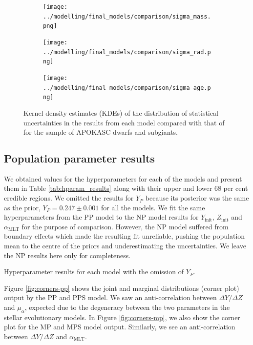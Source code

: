 \documentclass[a4paper,fleqn,usenatbib]{mnras}
\newcommand{\mlt}{\ensuremath{{\alpha_\mathrm{MLT}}}}
\begin{document}
\begin{figure}
    \centering
    \begin{subfigure}[b]{.33\linewidth}
        \centering
        \texttt{[image: ../modelling/final\_models/comparison/sigma\_mass.png]}
    \end{subfigure}%
    \begin{subfigure}[b]{.33\linewidth}
        \centering
        \texttt{[image: ../modelling/final\_models/comparison/sigma\_rad.png]}
    \end{subfigure}%
    \begin{subfigure}[b]{.33\linewidth}
        \centering
        \texttt{[image: ../modelling/final\_models/comparison/sigma\_age.png]}
    \end{subfigure}%
    \caption{Kernel density estimates (KDEs) of the distribution of statistical uncertainties in the results from each model compared with that of  for the sample of APOKASC dwarfs and subgiants.}
    \label{fig:unc-comp}
\end{figure}

\subsection{Population parameter results}\label{sec:hparam-results}

We obtained values for the hyperparameters for each of the models and present them in Table \ref{tab:hparam_results} along with their upper and lower 68 per cent credible regions. We omitted the results for $Y_P$ because its posterior was the same as the prior, $Y_P=0.247\pm0.001$ for all the models. We fit the same hyperparameters from the PP model to the NP model results for $Y_\mathrm{init}$, $Z_\mathrm{init}$ and $\mlt$ for the purpose of comparison. However, the NP model suffered from boundary effects which made the resulting fit unreliable, pushing the population mean to the centre of the priors and underestimating the uncertainties. We leave the NP results here only for completeness.

\begin{table}
	\centering
	\caption{Hyperparameter results for each model with the omission of $Y_P$.}
	\label{tab:hparam_results}
	
\end{table}

Figure \ref{fig:corners-pp} shows the joint and marginal distributions (corner plot) output by the PP and PPS model. We saw an anti-correlation between $\Delta Y / \Delta Z$ and $\mu_\alpha$, expected due to the degeneracy between the two parameters in the stellar evolutionary models. In Figure \ref{fig:corners-mp}, we also show the corner plot for the MP and MPS model output. Similarly, we see an anti-correlation between $\Delta Y / \Delta Z$ and $\mlt$.
\end{document}
